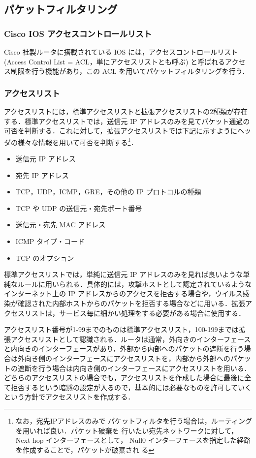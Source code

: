 \subsection{パケットフィルタリング}

\subsubsection{Cisco IOS アクセスコントロールリスト}
Cisco 社製ルータに搭載されている IOS には，アクセスコントロールリスト
(Access Control List = ACL，単にアクセスリストとも呼ぶ) と呼ばれるアクセ
ス制限を行う機能があり，この ACL を用いてパケットフィルタリングを行う．

\subsubsection{アクセスリスト}
アクセスリストには，標準アクセスリストと拡張アクセスリストの2種類が存在
する．標準アクセスリストでは，送信元 IP アドレスのみを見てパケット通過の
可否を判断する．これに対して，拡張アクセスリストでは下記に示すようにヘッ
ダの様々な情報を用いて可否を判断する\footnote{なお，宛先IPアドレスのみで
パケットフィルタを行う場合は，ルーティングを用いれば良い．パケット破棄を
行いたい宛先ネットワークに対して，Next hop インターフェースとして， 
Null0 インターフェースを指定した経路を作成することで，パケットが破棄され
る}．
\begin{itemize}
 \item 送信元 IP アドレス
 \item 宛先 IP アドレス
 \item TCP，UDP，ICMP，GRE，その他の IP プロトコルの種類
 \item TCP や UDP の送信元・宛先ポート番号
 \item 送信元・宛先 MAC アドレス
 \item ICMP タイプ・コード
 \item TCP のオプション
\end{itemize}

標準アクセスリストでは，単純に送信元 IP アドレスのみを見れば良いような単
純なルールに用いられる．具体的には，攻撃ホストとして認定されているような
インターネット上の IP アドレスからのアクセスを拒否する場合や，ウイルス感
染が確認された内部ホストからのパケットを拒否する場合などに用いる．拡張ア
クセスリストは，サービス毎に細かい処理をする必要がある場合に使用する．

アクセスリスト番号が1-99までのものは標準アクセスリスト，100-199までは拡
張アクセスリストとして認識される．ルータは通常，外向きのインターフェース
と内向きのインターフェースがあり，外部から内部へのパケットの遮断を行う場
合は外向き側のインターフェースにアクセスリストを，内部から外部へのパケッ
トの遮断を行う場合は内向き側のインターフェースにアクセスリストを用いる．
どちらのアクセスリストの場合でも，アクセスリストを作成した場合に最後に全
て拒否するという暗黙の設定が入るので，基本的には必要なものを許可していく
という方針でアクセスリストを作成する．

